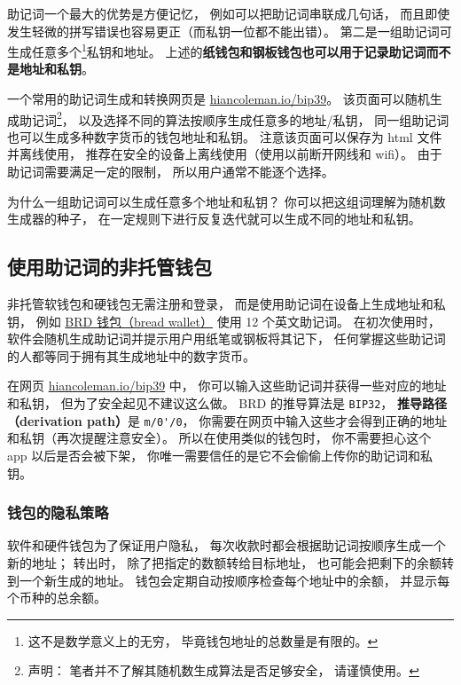 助记词一个最大的优势是方便记忆， 例如可以把助记词串联成几句话， 而且即使发生轻微的拼写错误也容易更正（而私钥一位都不能出错）。 第二是一组助记词可生成任意多个\footnote{这不是数学意义上的无穷， 毕竟钱包地址的总数量是有限的。}私钥和地址。 上述的\textbf{纸钱包和钢板钱包也可以用于记录助记词而不是地址和私钥}。

一个常用的助记词生成和转换网页是 \href{https://iancoleman.io/bip39/}{hiancoleman.io/bip39}。 该页面可以随机生成助记词\footnote{声明： 笔者并不了解其随机数生成算法是否足够安全， 请谨慎使用。}， 以及选择不同的算法按顺序生成任意多的地址/私钥， 同一组助记词也可以生成多种数字货币的钱包地址和私钥。 注意该页面可以保存为 html 文件并离线使用， 推荐在安全的设备上离线使用（使用以前断开网线和 wifi）。 由于助记词需要满足一定的限制， 所以用户通常不能逐个选择。

为什么一组助记词可以生成任意多个地址和私钥？ 你可以把这组词理解为随机数生成器的种子， 在一定规则下进行反复迭代就可以生成不同的地址和私钥。

\subsection{使用助记词的非托管钱包}
非托管软钱包和硬钱包无需注册和登录， 而是使用助记词在设备上生成地址和私钥， 例如 \href{https://brd.com/}{BRD 钱包（bread wallet）} 使用 12 个英文助记词。 在初次使用时， 软件会随机生成助记词并提示用户用纸笔或钢板将其记下， 任何掌握这些助记词的人都等同于拥有其生成地址中的数字货币。

在网页 \href{https://iancoleman.io/bip39/}{hiancoleman.io/bip39} 中， 你可以输入这些助记词并获得一些对应的地址和私钥， 但为了安全起见不建议这么做。 BRD 的推导算法是 \verb`BIP32`， \textbf{推导路径（derivation path）}是 \verb`m/0'/0`， 你需要在网页中输入这些才会得到正确的地址和私钥（再次提醒注意安全）。 所以在使用类似的钱包时， 你不需要担心这个 app 以后是否会被下架， 你唯一需要信任的是它不会偷偷上传你的助记词和私钥。

\subsubsection{钱包的隐私策略}
软件和硬件钱包为了保证用户隐私， 每次收款时都会根据助记词按顺序生成一个新的地址； 转出时， 除了把指定的数额转给目标地址， 也可能会把剩下的余额转到一个新生成的地址。 钱包会定期自动按顺序检查每个地址中的余额， 并显示每个币种的总余额。
